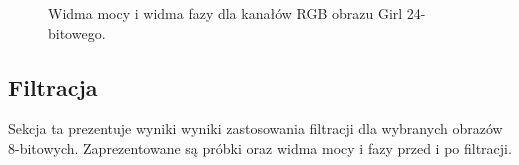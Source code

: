 \documentclass{classrep}
\begin{document}
\begin{figure}[H]
    \qquad
    \qquad
    \qquad
    \caption{Widma mocy i widma fazy dla kanałów RGB obrazu Girl 24-bitowego.}%
\end{figure} 

\subsection{Filtracja}
Sekcja ta prezentuje wyniki wyniki zastosowania filtracji dla wybranych obrazów 8-bitowych. Zaprezentowane są próbki oraz widma mocy i fazy przed i po filtracji. 
\end{document}
